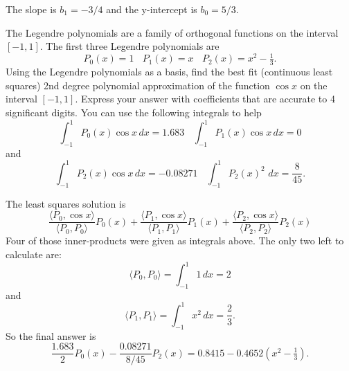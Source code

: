 \documentclass[11pt]{exam}
\newcommand{\inner}[1]{\langle {#1} \rangle}
\begin{document}
\begin{questions}
\begin{parts}
\begin{solution}
The slope is $b_1 = -3/4$ and the y-intercept is $b_0 = 5/3$.  
\end{solution}
\vfill

\end{parts}

\question The Legendre polynomials are a family of orthogonal functions on the interval $[-1,1]$.  The first three Legendre polynomials are 
$$P_0(x) = 1 ~~~~ P_1(x) = x ~~~~ P_2(x) = x^2 - \tfrac{1}{3}.$$
Using the Legendre polynomials as a basis, find the best fit (continuous least squares) 2nd degree polynomial approximation of the function $\cos x$ on the interval $[-1,1]$. Express your answer with coefficients that are accurate to 4 significant digits. You can use the following integrals to help
$$\int_{-1}^1 P_0(x) \cos x \,dx = 1.683 ~~~~ \int_{-1}^1 P_1(x) \cos x \,dx = 0$$
and
$$\int_{-1}^1 P_2(x) \cos x \,dx = -0.08271 ~~~~ \int_{-1}^1 P_2(x)^2 \, \, dx = \frac{8}{45}.$$ 
\begin{solution}
The least squares solution is 
$$\frac{\inner{P_0,\cos x}}{\inner{P_0,P_0}} P_0(x) + \frac{\inner{P_1,\cos x}}{\inner{P_1,P_1}} P_1(x) +\frac{\inner{P_2,\cos x}}{\inner{P_2,P_2}} P_2(x)$$
Four of those inner-products were given as integrals above.  The only two left to calculate are:
$$\inner{P_0,P_0} = \int_{-1}^1 1 \,dx = 2$$
and
$$\inner{P_1,P_1} = \int_{-1}^1 x^2 \,dx = \frac{2}{3}.$$
So the final answer is 
$$\frac{1.683}{2} P_0(x) - \frac{0.08271}{8/45} P_2(x) = 0.8415 - 0.4652 (x^2- \tfrac{1}{3}).$$
\end{solution}
\vfill

\newpage


\end{questions}
\end{document}
